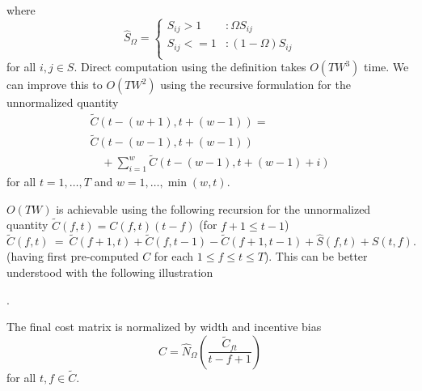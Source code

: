 \documentclass[twocolumn]{article}
\begin{document}
	where
	\begin{dmath*}
		\hat S_\Omega=	{ \left\{
			\begin{array}{ll}
				S_{ij} > 1  & :  \Omega S_{ij}   \\
				S_{ij} <= 1 & :  \left( 1-\Omega \right) S_{ij} \\
			\end{array}
			\right.} 
	\end{dmath*} for all $i,j \in S.$ Direct computation using the definition takes $O(TW^3)$ time. We can improve this to $O(TW^2)$ using the recursive formulation for the unnormalized quantity 
	\begin{dmath*} 
		\begin{array}{ll}
		\tilde C( t-(w+1),t+(w-1) ) = \\
		 \tilde C( t-(w-1),t+(w-1) ) \\
		\hspace{1em} +  \sum_{i=1}^{w} \tilde C(t-(w-1),t+(w-1)+i)
		\end{array}
	\end{dmath*} for all $t=1,\ldots, T$ and $w=1,\ldots,\min(w,t)$.
	
	$O(TW)$ is achievable using the following recursion for the unnormalized quantity $\tilde
	C(f,t) = C(f,t)(t-f)$ (for $f+1 \le t-1$)
	\begin{dmath*}
		\tilde C(f,t) ~=~ \tilde C(f+1,t) + \tilde C(f,t-1) - \tilde C(f+1,t-1) + \hat S(f,t) + \hat S(t,f).
	\end{dmath*} (having first pre-computed $C$ for each $1 \le f \le t \le T$). This can be better understood with the following illustration
	
	\begin{center}
		.
	\end{center} The final cost matrix is normalized by width and incentive bias
\[
C = \hat N_\Omega \left( \frac{ \tilde C_{ft} }{ t-f+1 } \right)
\] for all $t,f \in \tilde C$.
	
\end{document}
